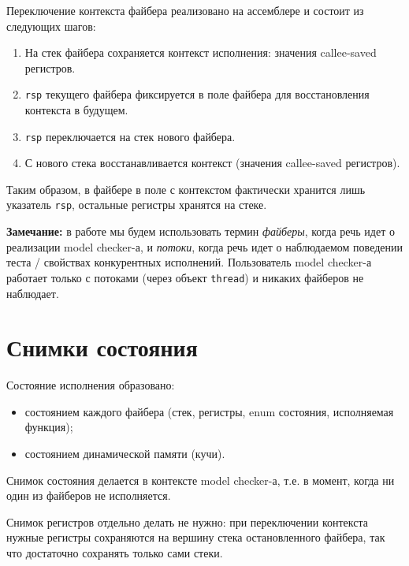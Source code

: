 Переключение контекста файбера реализовано на ассемблере и состоит из следующих шагов:

\begin{enumerate}

\item	На стек файбера сохраняется контекст исполнения: значения callee-saved регистров.

\item	\texttt{rsp} текущего файбера фиксируется в поле файбера для восстановления контекста в будущем.

\item	\texttt{rsp} переключается на стек нового файбера.

\item	С нового стека восстанавливается контекст (значения callee-saved регистров).

\end{enumerate}

Таким образом, в файбере в поле с контекстом фактически хранится лишь указатель \texttt{rsp}, остальные регистры хранятся на стеке.

\textbf{Замечание:} в работе мы будем использовать термин \emph{файберы}, когда речь идет о реализации model checker-а, и \emph{потоки}, когда речь идет о наблюдаемом поведении теста / свойствах конкурентных исполнений. Пользователь model checker-а работает только с потоками (через объект \texttt{thread}) и никаких файберов не наблюдает.


\section{Снимки состояния}

Состояние исполнения образовано:

\begin{itemize}
\item	состоянием каждого файбера (стек, регистры, enum состояния, исполняемая функция);

\item	состоянием динамической памяти (кучи).
\end{itemize}

Снимок состояния делается в контексте model checker-а, т.е. в момент, когда ни один из файберов не исполняется.

Снимок регистров отдельно делать не нужно: при переключении контекста нужные регистры сохраняются на вершину стека остановленного файбера, так что достаточно сохранять только сами стеки.

